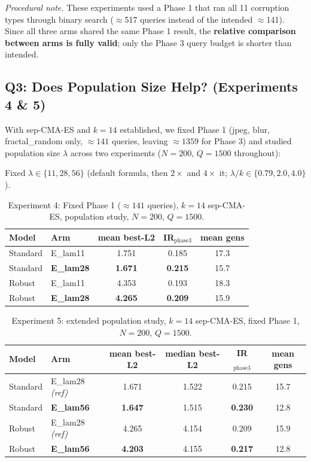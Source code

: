 \documentclass[11pt, a4paper]{article}
\begin{document}
\textit{Procedural note.} These experiments used a Phase 1 that ran all 11 corruption types through binary search ($\approx$517 queries instead of the intended $\approx$141). Since all three arms shared the same Phase 1 result, the \textbf{relative comparison between arms is fully valid}; only the Phase 3 query budget is shorter than intended.

\subsection{Q3: Does Population Size Help? (Experiments 4 \& 5)}

With sep-CMA-ES and $k=14$ established, we fixed Phase 1 (jpeg, blur, fractal\_random only, $\approx141$ queries, leaving $\approx1359$ for Phase 3) and studied population size $\lambda$ across two experiments ($N=200$, $Q=1500$ throughout):

\begin{description}[noitemsep]
  \item[E\_lam11 / E\_lam28 / E\_lam56] Fixed $\lambda\in\{11,28,56\}$ (default formula, then $2\times$ and $4\times$ it; $\lambda/k\in\{0.79,2.0,4.0\}$).
\end{description}

\begin{table}[htbp]
\centering
\caption{Experiment 4: Fixed Phase 1 ($\approx141$ queries), $k=14$ sep-CMA-ES, population study, $N=200$, $Q=1500$.}
\label{tab:exp_pop1}
\begin{tabular}{llccc}
\toprule
Model & Arm & mean best-L2 & IR$_\text{phase3}$ & mean gens \\
\midrule
Standard & E\_lam11 & 1.751 & 0.185 & 17.3 \\
Standard & \textbf{E\_lam28} & \textbf{1.671} & \textbf{0.215} & 15.7 \\
\midrule
Robust   & E\_lam11 & 4.353 & 0.193 & 18.3 \\
Robust   & \textbf{E\_lam28} & \textbf{4.265} & \textbf{0.209} & 15.9 \\
\bottomrule
\end{tabular}
\end{table}

\begin{table}[htbp]
\centering
\caption{Experiment 5: extended population study, $k=14$ sep-CMA-ES, fixed Phase 1, $N=200$, $Q=1500$.}
\label{tab:exp_pop2}
\begin{tabular}{llcccc}
\toprule
Model & Arm & mean best-L2 & median best-L2 & IR$_\text{phase3}$ & mean gens \\
\midrule
Standard & E\_lam28 \textit{(ref)} & 1.671 & 1.522 & 0.215 & 15.7 \\
Standard & \textbf{E\_lam56}   & \textbf{1.647} & 1.515 & \textbf{0.230} & 12.8 \\
\midrule
Robust & E\_lam28 \textit{(ref)} & 4.265 & 4.154 & 0.209 & 15.9 \\
Robust & \textbf{E\_lam56}   & \textbf{4.203} & 4.155 & \textbf{0.217} & 12.8 \\
\bottomrule
\end{tabular}
\end{table}
\end{document}
